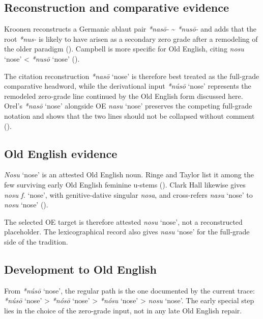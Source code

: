 \documentclass[
  british,
  a4paper,
  openany]{book}
\providecommand{\Recon}[1]{\emph{*#1}}
{\catcode`→=\active \global\def→{\ensuremath{\rightarrow}}}
\providecommand{\Recon}[1]{\emph{*#1}}
{\catcode`→=\active \global\def→{\ensuremath{\rightarrow}}}
\begin{document}
\subsection{Reconstruction and comparative
evidence}\label{reconstruction-and-comparative-evidence-92}

Kroonen reconstructs a Germanic ablaut pair \emph{*nasō-}
\textasciitilde{} \emph{*nusō-} and adds that the root \emph{*nus-} is
likely to have arisen as a secondary zero grade after a remodeling of
the older paradigm ().
Campbell is more specific for Old English, citing \emph{nosu} `nose'
\textless{} \Recon{nusō} `nose' ().

The citation reconstruction \Recon{nasō} `nose' is therefore best
treated as the full-grade comparative headword, while the derivational
input \Recon{núsō} `nose' represents the remodeled zero-grade line
continued by the Old English form discussed here. Orel's \Recon{nasō}
`nose' alongside OE \emph{nasu} `nose' preserves the competing
full-grade notation and shows that the two lines should not be collapsed
without comment ().

\subsection{Old English evidence}\label{old-english-evidence-92}

\emph{Nosu} `nose' is an attested Old English noun. Ringe and Taylor
list it among the few surviving early Old English feminine u-stems
(). Clark Hall
likewise gives \emph{nosu f.} `nose', with genitive-dative singular
\emph{nosa}, and cross-refers {\emph{nasu}} `nose' to \emph{nosu} `nose'
().

The selected OE target is therefore attested \emph{nosu} `nose', not a
reconstructed placeholder. The lexicographical record also gives
{\emph{nasu}} `nose' for the full-grade side of the tradition.

\subsection{Development to Old
English}\label{development-to-old-english-92}

From \Recon{núsō} `nose', the regular path is the one documented by the
current trace: \Recon{núsō} `nose' \textgreater{} \Recon{nósō} `nose'
\textgreater{} \Recon{nósu} `nose' \textgreater{} \emph{nosu} `nose'.
The early special step lies in the choice of the zero-grade input, not
in any late Old English repair.
\end{document}
